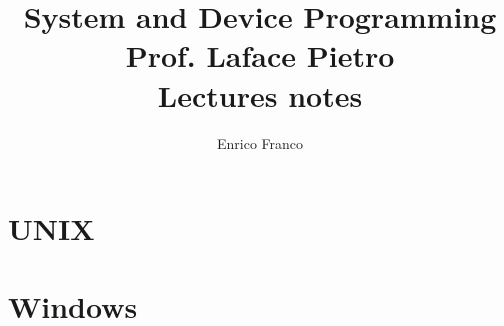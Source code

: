 \documentclass{report}
\author{Enrico Franco}
\title{System and Device Programming \\
	Prof. Laface Pietro \\
	Lectures notes}
\begin{document}
\maketitle
\tableofcontents

\part{UNIX}









\part{Windows}


\end{document}
